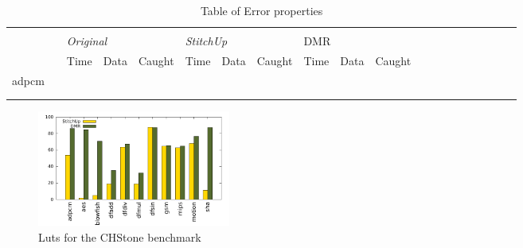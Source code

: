 \begin{table}[t]
\centering
\caption{Table of Error properties}
\label{tab:errorTable}
\begin{tabular}{llllllllllllllllllll}
\cline{1-3}
\textbf{}                    &                    & \textbf{}     &          &            &            &            &             &       &       &         &       &       &      &       &       &      &       &       &      \\ \cline{1-1} \cline{3-5}
\textbf{}                    &                    & \multicolumn{3}{l}{\textit{Original}} & \multicolumn{3}{l}{\textit{StitchUp}} & \multicolumn{3}{l}{DMR} & \multicolumn{3}{l}{} & \multicolumn{3}{l}{} & \multicolumn{3}{l}{} \\ \cline{1-1} \cline{3-5}
                             &                    & Time          & Data     & Caught     & Time       & Data       & Caught      & Time  & Data  & Caught  &       &       &      &       &       &      &       &       &      \\ \cline{1-1} \cline{3-3}
{\color[HTML]{333333} adpcm} &                    &               &          &            &            &            &             &       &       &         &       &       &      &       &       &      &       &       &      \\ \cline{1-1} \cline{3-3}
                             &                    &               &          &            &            &            &             &       &       &         &       &       &      &       &       &      &       &       &      \\ \cline{1-1} \cline{3-3}
                             & \multirow{-6}{*}{} &               &          &            &            &            &             &       &       &         &       &       &      &       &       &      &       &       &      \\ \cline{1-3}
\end{tabular}
\end{table}

\begin{figure}[h]
\centering
\includegraphics[width=2.5in]{./graphs/chstone_luts_24_09_2015.pdf}
\caption{Luts for the CHStone benchmark}
\label{fig:luts_result}
\end{figure}

